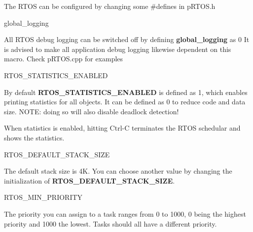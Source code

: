 The R\+T\+OS can be configured by changing some \#define\textquotesingle{}s in p\+R\+T\+O\+S.\+h

\begin{DoxyParagraph}{global\+\_\+logging}

\end{DoxyParagraph}
All R\+T\+OS debug logging can be switched off by defining {\bfseries global\+\_\+logging} as 0 It is advised to make all application debug logging likewise dependent on this macro. Check p\+R\+T\+O\+S.\+cpp for examples

\begin{DoxyParagraph}{R\+T\+O\+S\+\_\+\+S\+T\+A\+T\+I\+S\+T\+I\+C\+S\+\_\+\+E\+N\+A\+B\+L\+ED}

\end{DoxyParagraph}
By default {\bfseries R\+T\+O\+S\+\_\+\+S\+T\+A\+T\+I\+S\+T\+I\+C\+S\+\_\+\+E\+N\+A\+B\+L\+ED} is defined as 1, which enables printing statistics for all objects. It can be defined as 0 to reduce code and data size. N\+O\+TE\+: doing so will also disable deadlock detection!

When statistics is enabled, hitting Ctrl-\/C terminates the R\+T\+OS schedular and shows the statistics.

\begin{DoxyParagraph}{R\+T\+O\+S\+\_\+\+D\+E\+F\+A\+U\+L\+T\+\_\+\+S\+T\+A\+C\+K\+\_\+\+S\+I\+ZE}

\end{DoxyParagraph}
The default stack size is 4K. You can choose another value by changing the initialization of {\bfseries R\+T\+O\+S\+\_\+\+D\+E\+F\+A\+U\+L\+T\+\_\+\+S\+T\+A\+C\+K\+\_\+\+S\+I\+ZE}.

\begin{DoxyParagraph}{R\+T\+O\+S\+\_\+\+M\+I\+N\+\_\+\+P\+R\+I\+O\+R\+I\+TY}

\end{DoxyParagraph}
The priority you can assign to a task ranges from 0 to 1000, 0 being the highest priority and 1000 the lowest. Tasks should all have a different priority. 